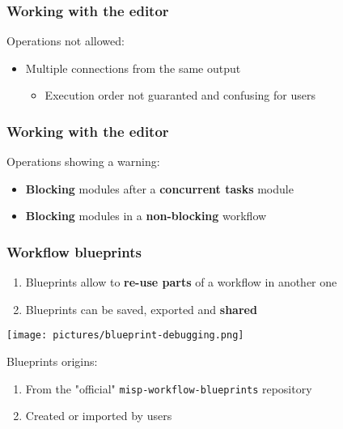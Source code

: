 \begin{frame}
    \frametitle{Working with the editor}
    Operations not allowed:
    \begin{itemize}
        \item Multiple connections from the same output
        \begin{itemize}
            \item Execution order not guaranted and confusing for users
        \end{itemize}
    \end{itemize}
    \begin{center}
    \end{center}
\end{frame}

\begin{frame}
    \frametitle{Working with the editor}
    Operations showing a warning:
    \begin{itemize}
        \item \textbf{Blocking} modules after a \textbf{concurrent tasks} module
        \item \textbf{Blocking} modules in a \textbf{non-blocking} workflow
    \end{itemize}
    \begin{center}
    \end{center}
\end{frame}

\begin{frame}
    \frametitle{Workflow blueprints}
    \begin{enumerate}
        \item Blueprints allow to \textbf{re-use parts} of a workflow in another one
        \item Blueprints can be saved, exported and \textbf{shared}
    \end{enumerate}
    \begin{center}
        \texttt{[image: pictures/blueprint-debugging.png]}
    \end{center}
    Blueprints origins:
    \begin{enumerate}
        \item From the "official" \texttt{misp-workflow-blueprints} repository
        \item Created or imported by users
    \end{enumerate}
\end{frame}

